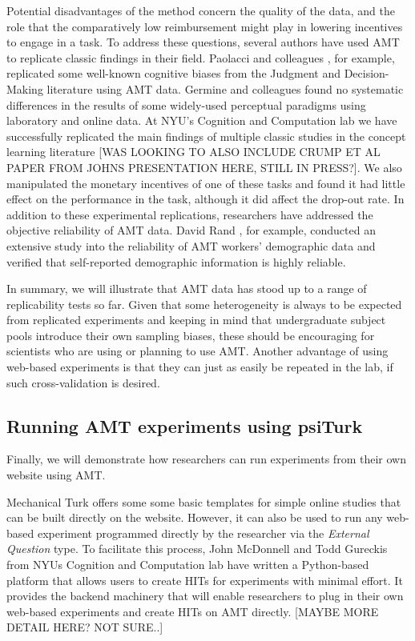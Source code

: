 \documentclass[10pt,letterpaper]{article}
\begin{document}
Potential disadvantages of the method concern the quality of the data, and the role that the comparatively low reimbursement might play in lowering incentives to engage in a task. To address these questions, several authors have used AMT to replicate classic findings in their field. Paolacci and colleagues \citeyear{paolacci2010running}, for example, replicated some well-known  cognitive biases from the Judgment and Decision-Making literature using AMT data. Germine and colleagues \citeyear{germine2012web}  found no systematic differences in the results of  some widely-used perceptual paradigms using laboratory and online data. At NYU's Cognition and Computation lab we have successfully replicated the main findings of multiple classic studies in the concept learning literature [WAS LOOKING TO ALSO INCLUDE CRUMP ET AL PAPER FROM JOHNS PRESENTATION HERE, STILL IN PRESS?]. We also manipulated the monetary incentives of one of these tasks and found it had little effect on the performance in the task, although it did affect the drop-out rate.
In addition to these experimental replications, researchers have  addressed the objective reliability of AMT data. David Rand \citeyear{rand2012promise}, for example, conducted an extensive study into the reliability of AMT workers' demographic data  and verified that self-reported demographic information is highly reliable.

In summary, we will illustrate that AMT data has stood up to a range of replicability tests so far. Given that some heterogeneity is always to be expected from replicated experiments and keeping in mind that undergraduate subject pools introduce their own sampling biases, these should be encouraging for scientists who are using or planning to use AMT. Another advantage of using web-based experiments is that they can just as easily be repeated in the lab, if such cross-validation is desired.   


\subsection{Running AMT experiments using psiTurk}
Finally, we will demonstrate how researchers can run experiments from their own website using AMT.

Mechanical Turk offers some some basic templates for simple online studies that can be built directly on the website. However, it can also be used to run any web-based experiment programmed directly by the researcher via the \emph{External Question} type. To facilitate this process, John McDonnell and Todd Gureckis from NYUs Cognition and Computation lab have written a Python-based platform that allows users to create  HITs for experiments with minimal effort. It provides the backend machinery that will enable researchers to plug in their own web-based experiments and create HITs on AMT directly. 
[MAYBE MORE DETAIL HERE? NOT SURE..]
\end{document}
